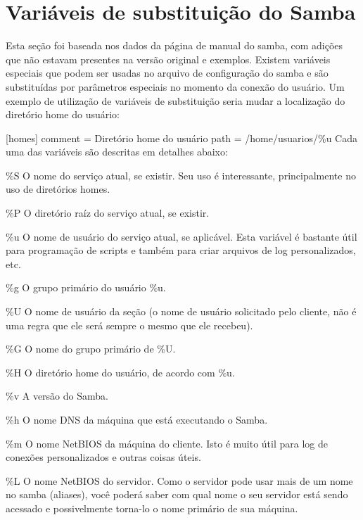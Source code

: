 

\section{Variáveis de substituição do Samba}

Esta seção foi baseada nos dados da página de manual do samba, com adições que não estavam presentes na versão original e exemplos. Existem variáveis especiais que podem ser usadas no arquivo de configuração do samba e são substituídas por parâmetros especiais no momento da conexão do usuário. Um exemplo de utilização de variáveis de substituição seria mudar a localização do diretório home do usuário:

     [homes]
      comment = Diretório home do usuário
      path = /home/usuarios/\%u
Cada uma das variáveis são descritas em detalhes abaixo:

\%S
O nome do serviço atual, se existir. Seu uso é interessante, principalmente no uso de diretórios homes.

\%P
O diretório raíz do serviço atual, se existir.

\%u
O nome de usuário do serviço atual, se aplicável. Esta variável é bastante útil para programação de scripts e também para criar arquivos de log personalizados, etc.

\%g
O grupo primário do usuário \%u.

\%U
O nome de usuário da seção (o nome de usuário solicitado pelo cliente, não é uma regra que ele será sempre o mesmo que ele recebeu).

\%G
O nome do grupo primário de \%U.

\%H
O diretório home do usuário, de acordo com \%u.

\%v
A versão do Samba.

\%h
O nome DNS da máquina que está executando o Samba.

\%m
O nome NetBIOS da máquina do cliente. Isto é muito útil para log de conexões personalizados e outras coisas úteis.

\%L
O nome NetBIOS do servidor. Como o servidor pode usar mais de um nome no samba (aliases), você poderá saber com qual nome o seu servidor está sendo acessado e possivelmente torna-lo o nome primário de sua máquina.


